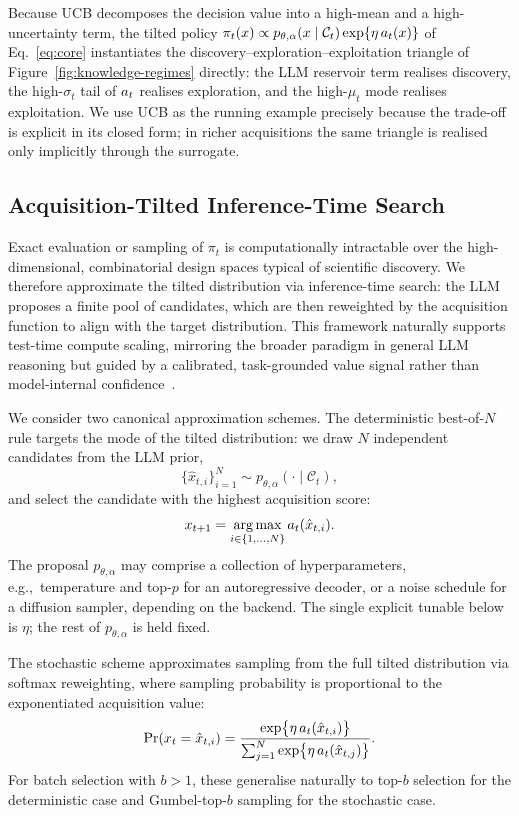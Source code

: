Because UCB decomposes the decision value into a high-mean and a high-uncertainty term, the tilted policy $\pi_t(x)\propto p_{\theta,\alpha}(x\mid\mathcal{C}_t)\exp\{\eta\,a_t(x)\}$ of Eq.~\eqref{eq:core} instantiates the discovery--exploration--exploitation triangle of Figure~\ref{fig:knowledge-regimes} directly: the LLM reservoir term realises discovery, the high-$\sigma_t$ tail of $a_t$ realises exploration, and the high-$\mu_t$ mode realises exploitation. We use UCB as the running example precisely because the trade-off is explicit in its closed form; in richer acquisitions the same triangle is realised only implicitly through the surrogate.

\subsection{Acquisition-Tilted Inference-Time Search}
\label{sec:inference-time-search}

Exact evaluation or sampling of $\pi_t$ is computationally intractable over the high-dimensional, combinatorial design spaces typical of scientific discovery. We therefore approximate the tilted distribution via inference-time search: the LLM proposes a finite pool of candidates, which are then reweighted by the acquisition function to align with the target distribution. This framework naturally supports test-time compute scaling, mirroring the broader paradigm in general LLM reasoning but guided by a calibrated, task-grounded value signal rather than model-internal confidence~\citep{wang2024openr}.

We consider two canonical approximation schemes. The deterministic best-of-$N$ rule targets the mode of the tilted distribution: we draw $N$ independent candidates from the LLM prior,
\[
\{\hat{x}_{t,i}\}_{i=1}^N \sim p_{\theta, \alpha}(\cdot \mid \mathcal{C}_t),
\]
and select the candidate with the highest acquisition score:
\[
x_{t+1} = \operatorname*{arg\,max}_{i \in \{1,\dots,N\}} a_t(\hat{x}_{t,i}).
\]
The proposal $p_{\theta,\alpha}$ may comprise a collection of hyperparameters, e.g.,\ temperature and top-$p$ for an autoregressive decoder, or a noise schedule for a diffusion sampler, depending on the backend. The single explicit tunable below is $\eta$; the rest of $p_{\theta,\alpha}$ is held fixed.

The stochastic scheme approximates sampling from the full tilted distribution via softmax reweighting, where sampling probability is proportional to the exponentiated acquisition value:
\begin{equation}
\label{eq:softmax_reweight}
\Pr(x_t = \hat{x}_{t,i})
=
\frac{\exp\bigl\{\eta \, a_t(\hat{x}_{t,i})\bigr\}}
{\sum_{j=1}^N \exp\bigl\{\eta \, a_t(\hat{x}_{t,j})\bigr\}}.
\end{equation}
For batch selection with $b>1$, these generalise naturally to top-$b$ selection for the deterministic case and Gumbel-top-$b$ sampling for the stochastic case.

